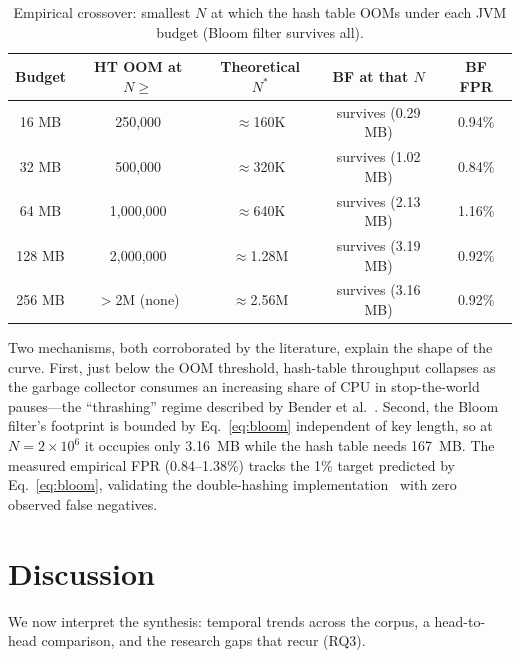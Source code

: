 \documentclass[conference]{IEEEtran}
\begin{document}
\begin{table}[!t]
\caption{Empirical crossover: smallest $N$ at which the hash table OOMs
under each JVM budget (Bloom filter survives all).}
\label{tab:oom}
\centering
\renewcommand{\arraystretch}{1.25}
\footnotesize
\begin{tabular}{@{}ccccc@{}}
\toprule
\textbf{Budget} & \textbf{HT OOM at} $N\ge$ & \textbf{Theoretical} $N^\ast$ &
\textbf{BF at that} $N$ & \textbf{BF FPR} \\
\midrule
16 MB  & 250{,}000   & $\approx$160K & survives (0.29 MB) & 0.94\% \\
32 MB  & 500{,}000   & $\approx$320K & survives (1.02 MB) & 0.84\% \\
64 MB  & 1{,}000{,}000 & $\approx$640K & survives (2.13 MB) & 1.16\% \\
128 MB & 2{,}000{,}000 & $\approx$1.28M & survives (3.19 MB) & 0.92\% \\
256 MB & $>$2M (none) & $\approx$2.56M & survives (3.16 MB) & 0.92\% \\
\bottomrule
\end{tabular}
\end{table}

Two mechanisms, both corroborated by the literature, explain the shape of the
curve. First, just below the OOM threshold, hash-table throughput collapses as
the garbage collector consumes an increasing share of CPU in stop-the-world
pauses---the ``thrashing'' regime described by Bender et
al.~\cite{bender2012dont}. Second, the Bloom filter's footprint is bounded by
Eq.~\eqref{eq:bloom} independent of key length, so at $N=2\times10^6$ it occupies
only 3.16~MB while the hash table needs 167~MB. The measured empirical FPR
(0.84--1.38\%) tracks the 1\% target predicted by Eq.~\eqref{eq:bloom},
validating the double-hashing implementation~\cite{kirsch2008less} with zero
observed false negatives.

\section{Discussion}
\label{sec:discussion}
We now interpret the synthesis: temporal trends across the corpus, a
head-to-head comparison, and the research gaps that recur (RQ3).
\end{document}
